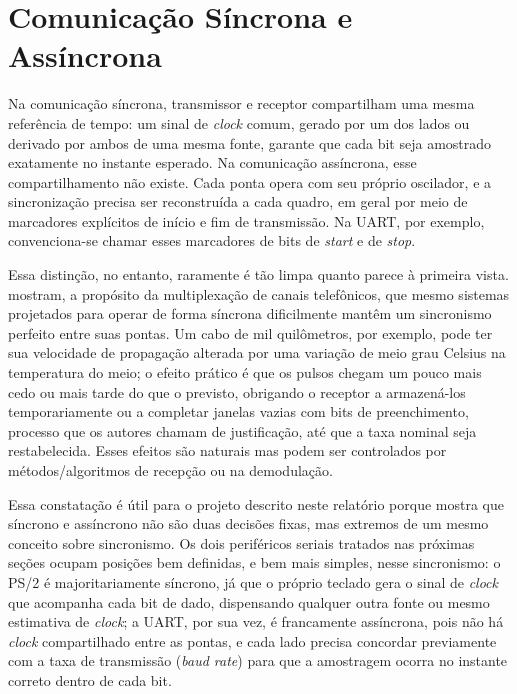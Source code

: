 \documentclass[
	12pt,
	oneside,
	a4paper,
	english,
	french,
	spanish,
	brazil,
	]{abntex2}
\begin{document}
\section{Comunicação Síncrona e Assíncrona}
\label{sec:comunicacao_sincrona_assincrona}
Na comunicação síncrona, transmissor e receptor compartilham uma mesma referência de tempo: um sinal de \emph{clock} comum, gerado por um dos lados ou derivado por ambos de uma mesma fonte, garante que cada bit seja amostrado exatamente no instante esperado. Na comunicação assíncrona, esse compartilhamento não existe. Cada ponta opera com seu próprio oscilador, e a sincronização precisa ser reconstruída a cada quadro, em geral por meio de marcadores explícitos de início e fim de transmissão. Na UART, por exemplo, convenciona-se chamar esses marcadores de bits de \emph{start} e de \emph{stop}.

Essa distinção, no entanto, raramente é tão limpa quanto parece à primeira vista.  mostram, a propósito da multiplexação de canais telefônicos, que mesmo sistemas projetados para operar de forma síncrona dificilmente mantêm um sincronismo perfeito entre suas pontas. Um cabo de mil quilômetros, por exemplo, pode ter sua velocidade de propagação alterada por uma variação de meio grau Celsius na temperatura do meio; o efeito prático é que os pulsos chegam um pouco mais cedo ou mais tarde do que o previsto, obrigando o receptor a armazená-los temporariamente ou a completar janelas vazias com bits de preenchimento, processo que os autores chamam de justificação, até que a taxa nominal seja restabelecida. Esses efeitos são naturais mas podem ser controlados por métodos/algoritmos de recepção ou na demodulação.

Essa constatação é útil para o projeto descrito neste relatório porque mostra que síncrono e assíncrono não são duas decisões fixas, mas extremos de um mesmo conceito sobre sincronismo. Os dois periféricos seriais tratados nas próximas seções ocupam posições bem definidas, e bem mais simples, nesse sincronismo: o PS/2 é majoritariamente síncrono, já que o próprio teclado gera o sinal de \emph{clock} que acompanha cada bit de dado, dispensando qualquer outra fonte ou mesmo estimativa de \emph{clock}; a UART, por sua vez, é francamente assíncrona, pois não há \emph{clock} compartilhado entre as pontas, e cada lado precisa concordar previamente com a taxa de transmissão (\emph{baud rate}) para que a amostragem ocorra no instante correto dentro de cada bit.
\end{document}
